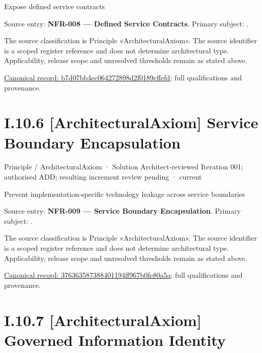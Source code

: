 Expose defined service contracts



Source entry: \textbf{NFR-008 — Defined Service Contracts}. Primary subject: \texttt{}.



The source classification is Principle «ArchitecturalAxiom». The source identifier is a scoped register reference and does not determine architectural type. Applicability, release scope and unresolved thresholds remain as stated above.


{\footnotesize \href{../../../../../../../continuum/motivation/principle/architectural-axiom/b7d07bb4ec064272898d2f0189cffefd.md}{Canonical record: b7d07bb4ec064272898d2f0189cffefd}; full qualifications and provenance.}\par
\section*{I.10.6 [ArchitecturalAxiom] Service Boundary Encapsulation}
\label{navigation:I.10.6}

\label{element:376363587388401194ff967b0fe80a5a}
{\small Principle / ArchitecturalAxiom · Solution Architect-reviewed Iteration 001; authorised ADD; resulting increment review pending · current}\par

Prevent implementation-specific technology leakage across service boundaries



Source entry: \textbf{NFR-009 — Service Boundary Encapsulation}. Primary subject: \texttt{}.



The source classification is Principle «ArchitecturalAxiom». The source identifier is a scoped register reference and does not determine architectural type. Applicability, release scope and unresolved thresholds remain as stated above.


{\footnotesize \href{../../../../../../../continuum/motivation/principle/architectural-axiom/376363587388401194ff967b0fe80a5a.md}{Canonical record: 376363587388401194ff967b0fe80a5a}; full qualifications and provenance.}\par
\section*{I.10.7 [ArchitecturalAxiom] Governed Information Identity}
\label{navigation:I.10.7}


